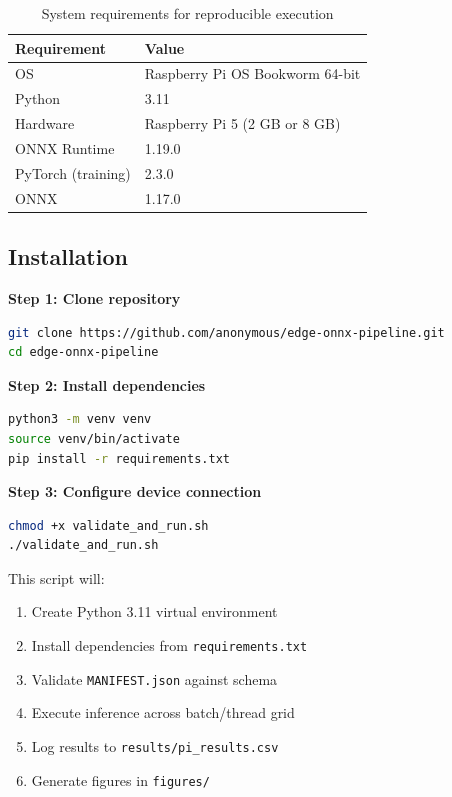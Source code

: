\documentclass[review]{elsarticle}
\begin{document}
\begin{table}[h]
\centering
\caption{System requirements for reproducible execution}
\label{tab:requirements}
\begin{tabular}{ll}
\toprule
\textbf{Requirement} & \textbf{Value} \\
\midrule
OS & Raspberry Pi OS Bookworm 64-bit \\
Python & 3.11 \\
Hardware & Raspberry Pi 5 (2 GB or 8 GB) \\
ONNX Runtime & 1.19.0 \\
PyTorch (training) & 2.3.0 \\
ONNX & 1.17.0 \\
\bottomrule
\end{tabular}
\end{table}

\subsection{Installation}

\textbf{Step 1: Clone repository}
\begin{lstlisting}[language=bash]
git clone https://github.com/anonymous/edge-onnx-pipeline.git
cd edge-onnx-pipeline
\end{lstlisting}

\textbf{Step 2: Install dependencies}
\begin{lstlisting}[language=bash]
python3 -m venv venv
source venv/bin/activate
pip install -r requirements.txt
\end{lstlisting}

\textbf{Step 3: Configure device connection}

\begin{lstlisting}[language=bash]
chmod +x validate_and_run.sh
./validate_and_run.sh
\end{lstlisting}

This script will:

\begin{enumerate}
\item Create Python 3.11 virtual environment
\item Install dependencies from \texttt{requirements.txt}
\item Validate \texttt{MANIFEST.json} against schema
\item Execute inference across batch/thread grid
\item Log results to \texttt{results/pi\_results.csv}
\item Generate figures in \texttt{figures/}
\end{enumerate}
\end{document}
